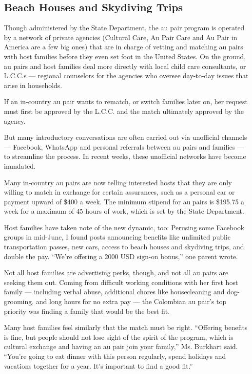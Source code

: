 \hypertarget{beach-houses-and-skydiving-trips}{%
\subsection{Beach Houses and Skydiving
Trips}\label{beach-houses-and-skydiving-trips}}

Though administered by the State Department, the au pair program is
operated by a network of private agencies (Cultural Care, Au Pair Care
and Au Pair in America are a few big ones) that are in charge of vetting
and matching au pairs with host families before they even set foot in
the United States. On the ground, au pairs and host families deal more
directly with local child care consultants, or L.C.C.s --- regional
counselors for the agencies who oversee day-to-day issues that arise in
households.

If an in-country au pair wants to rematch, or switch families later on,
her request must first be approved by the L.C.C. and the match
ultimately approved by the agency.

But many introductory conversations are often carried out via unofficial
channels --- Facebook, WhatsApp and personal referrals between au pairs
and families --- to streamline the process. In recent weeks, these
unofficial networks have become inundated.

Many in-country au pairs are now telling interested hosts that they are
only willing to match in exchange for certain assurances, such as a
personal car or payment upward of \$400 a week. The minimum stipend for
au pairs is \$195.75 a week for a maximum of 45 hours of work, which is
set by the State Department.

Host families have taken note of the new dynamic, too: Perusing some
Facebook groups in mid-June, I found posts announcing benefits like
unlimited public transportation passes, new cars, access to beach houses
and skydiving trips, and double the pay. ``We're offering a 2000 USD
sign-on bonus,'' one parent wrote.

Not all host families are advertising perks, though, and not all au
pairs are seeking them out. Coming from difficult working conditions
with her first host family --- including verbal abuse, additional chores
like housecleaning and dog-grooming, and long hours for no extra pay ---
the Colombian au pair's top priority was finding a family that would be
the best fit.

Many host families feel similarly that the match must be right.
``Offering benefits is fine, but people should not lose sight of the
spirit of the program, which is cultural exchange and having an au pair
join your family,'' Ms. Burkhart said. ``You're going to eat dinner with
this person regularly, spend holidays and vacations together for a year.
It's important to find a good fit.''

